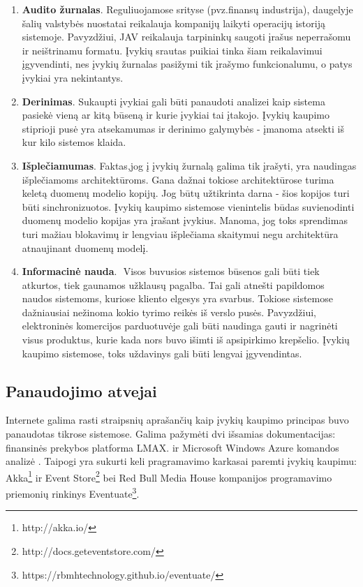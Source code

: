 \begin{enumerate}

  \item \textbf{Audito žurnalas}. Reguliuojamose srityse (pvz.finansų industrija), daugelyje šalių valstybės nuostatai reikalauja kompanijų laikyti operacijų istoriją sistemoje. Pavyzdžiui, JAV reikalauja tarpininkų saugoti įrašus neperrašomu ir neištrinamu formatu. \cite{US:StorageRules} Įvykių srautas puikiai tinka šiam reikalavimui įgyvendinti, nes įvykių žurnalas pasižymi tik įrašymo funkcionalumu, o patys įvykiai yra nekintantys.

  \item \textbf{Derinimas}. Sukaupti įvykiai gali būti panaudoti analizei kaip sistema pasiekė vieną ar kitą būseną ir kurie įvykiai tai įtakojo. Įvykių kaupimo stiprioji pusė yra atsekamumas ir derinimo galymybės - įmanoma atsekti iš kur kilo sistemos klaida.

  \item \textbf{Išplečiamumas}. Faktas,jog į įvykių žurnalą galima tik įrašyti, yra naudingas išplečiamoms architektūroms. Gana dažnai tokiose architektūrose turima keletą duomenų modelio kopijų. Jog būtų užtikrinta darna - šios kopijos turi būti sinchronizuotos. Įvykių kaupimo sistemose vienintelis būdas suvienodinti duomenų modelio kopijas yra įrašant įvykius. Manoma, jog toks sprendimas turi mažiau blokavimų ir lengviau išplečiama skaitymui negu architektūra atnaujinant duomenų modelį. \cite{GetEventStore:Basics}

  \item \textbf{Informacinė nauda}.  Visos buvusios sistemos būsenos gali būti tiek atkurtos, tiek gaunamos užklausų pagalba. Tai gali atnešti papildomos naudos sistemoms, kuriose kliento elgesys yra svarbus. Tokiose sistemose dažniausiai nežinoma kokio tyrimo reikės iš verslo pusės. Pavyzdžiui, elektroninės komercijos parduotuvėje gali būti naudinga gauti ir nagrinėti visus produktus, kurie kada nors buvo išimti iš apsipirkimo krepšelio. Įvykių kaupimo sistemose, toks uždavinys gali būti lengvai įgyvendintas.

\end{enumerate}

\subsection{Panaudojimo atvejai}

Internete galima rasti straipsnių aprašančių kaip įvykių kaupimo principas buvo panaudotas tikrose sistemose. Galima pažymėti dvi išsamias dokumentacijas: finansinės prekybos platforma LMAX. \cite{Fowler:LMAX} ir Microsoft Windows Azure komandos analizė \cite{Betts:2013:ECE:2509680}. Taipogi yra sukurti keli pragramavimo karkasai paremti įvykių kaupimu: Akka\footnote{http://akka.io/} ir Event Store\footnote{http://docs.geteventstore.com/} bei Red Bull Media House kompanijos programavimo priemonių rinkinys Eventuate\footnote{https://rbmhtechnology.github.io/eventuate/}.

